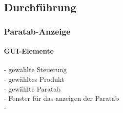 \documentclass[12pt,a4paper]{article}
\begin{document}
\subsection{Durchführung}
\subsubsection{Paratab-Anzeige}
\paragraph{GUI-Elemente}
- gewählte Steuerung\\- gewähltes Produkt\\- gewählte Paratab\\- Fenster für das anzeigen der Paratab\\- 
\end{document}
